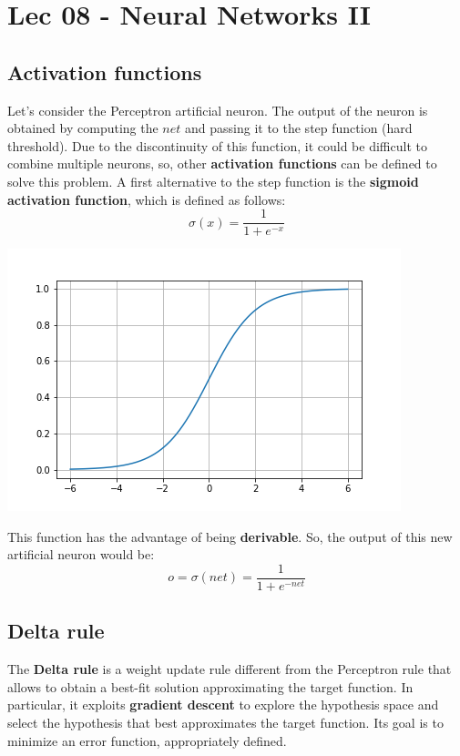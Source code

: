 \chapter{Lec 08 - Neural Networks II}

\section{Activation functions}
Let's consider the Perceptron artificial neuron. The output of the neuron is obtained by computing the $net$ and passing it to the step function (hard threshold). Due to the discontinuity of this function, it could be difficult to combine multiple neurons, so, other \textbf{activation functions} can be defined to solve this problem. A first alternative to the step function is the \textbf{sigmoid activation function}, which is defined as follows:
\[\sigma(x) = \frac{1}{1 + e^{-x}}\]
\begin{center}
    \includegraphics[scale = 0.7]{images/sigmoid.png}
\end{center}
This function has the advantage of being \textbf{derivable}. So, the output of this new  artificial neuron would be:
\[o = \sigma(net) = \frac{1}{1 + e^{-net}}\]
\section{Delta rule}
The \textbf{Delta rule} is a weight update rule different from the Perceptron rule that allows to obtain a best-fit solution approximating the target function. In particular, it exploits \textbf{gradient descent} to explore the hypothesis space and select the hypothesis that best approximates the target function. Its goal is to minimize an error function, appropriately defined.
